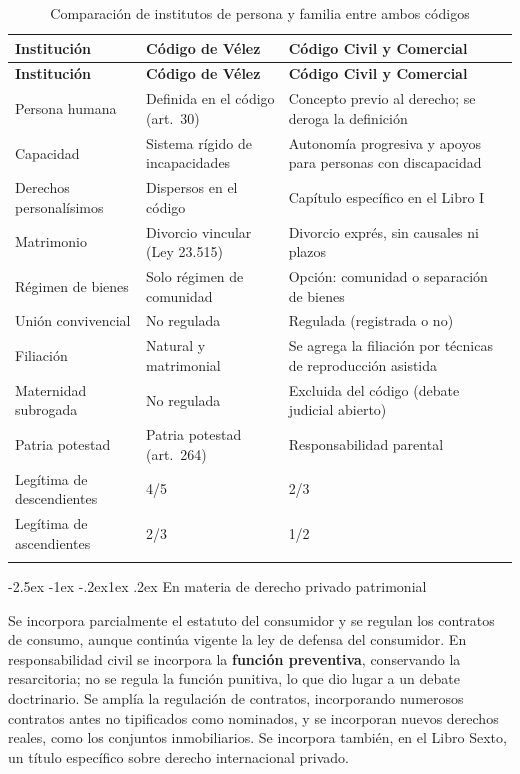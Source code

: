\documentclass[12pt,oneside]{book}
\makeatletter
\renewcommand\subsection{\@startsection{subsection}{2}{\z@}%
  {-2.5ex \@plus -1ex \@minus -.2ex}{1ex \@plus .2ex}%
  {\normalfont\normalsize\bfseries}}
\makeatother
\begin{document}
\begin{longtable}{@{}B{0.20\textwidth}L{0.34\textwidth}L{0.34\textwidth}@{}}
\toprule
\textbf{Institución} & \textbf{Código de Vélez} & \textbf{Código Civil y Comercial} \\
\midrule
\endfirsthead
\toprule
\textbf{Institución} & \textbf{Código de Vélez} & \textbf{Código Civil y Comercial} \\
\midrule
\endhead
\bottomrule
\endfoot
Persona humana & Definida en el código (art.~30) & Concepto previo al derecho; se deroga la definición \\
Capacidad & Sistema rígido de incapacidades & Autonomía progresiva y apoyos para personas con discapacidad \\
Derechos personalísimos & Dispersos en el código & Capítulo específico en el Libro I \\
Matrimonio & Divorcio vincular (Ley 23.515) & Divorcio exprés, sin causales ni plazos \\
Régimen de bienes & Solo régimen de comunidad & Opción: comunidad o separación de bienes \\
Unión convivencial & No regulada & Regulada (registrada o no) \\
Filiación & Natural y matrimonial & Se agrega la filiación por técnicas de reproducción asistida \\
Maternidad subrogada & No regulada & Excluida del código (debate judicial abierto) \\
Patria potestad & Patria potestad (art.~264) & Responsabilidad parental \\
Legítima de descendientes & 4/5 & 2/3 \\
Legítima de ascendientes & 2/3 & 1/2 \\
\caption{Comparación de institutos de persona y familia entre ambos códigos}\\
\end{longtable}

\subsection{En materia de derecho privado patrimonial}

Se incorpora parcialmente el estatuto del consumidor y se regulan los contratos de consumo, aunque continúa vigente la ley de defensa del consumidor. En responsabilidad civil se incorpora la \textbf{función preventiva}, conservando la resarcitoria; no se regula la función punitiva, lo que dio lugar a un debate doctrinario. Se amplía la regulación de contratos, incorporando numerosos contratos antes no tipificados como nominados, y se incorporan nuevos derechos reales, como los conjuntos inmobiliarios. Se incorpora también, en el Libro Sexto, un título específico sobre derecho internacional privado.
\end{document}
